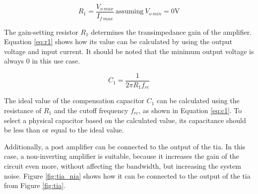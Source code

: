 \begin{equation}\label{eq:r1}
	R_1 = \frac{V_{o\ max}}{I_{f\ max}}\ \text{assuming}\ V_{o\ min} = 0 \unit{\volt}
\end{equation}

The gain-setting resistor $R_1$ determines the transimpedance gain of the amplifier. Equation \eqref{eq:r1} shows how its value can be calculated by using the output voltage and input current. It should be noted that the minimum output voltage is always 0 in this use case.

\begin{equation}\label{eq:c1}
	C_1 = \frac{1}{2 \pi R_1 f_{rc}}
\end{equation}

The ideal value of the compensation capacitor $C_1$ can be calculated using the resistance of $R_1$ and the cutoff frequency $f_{rc}$, as shown in Equation \eqref{eq:c1}. To select a physical capacitor based on the calculated value, its capacitance should be less than or equal to the ideal value.


Additionally, a post amplifier can be connected to the output of the \gls{tia}. In this case, a non-inverting amplifier is suitable, because it increases the gain of the circuit even more, without affecting the bandwidth, but increasing the system noise. Figure \ref{fig:tia_nia} shows how it can be connected to the output of the \gls{tia} from Figure \ref{fig:tia}.

